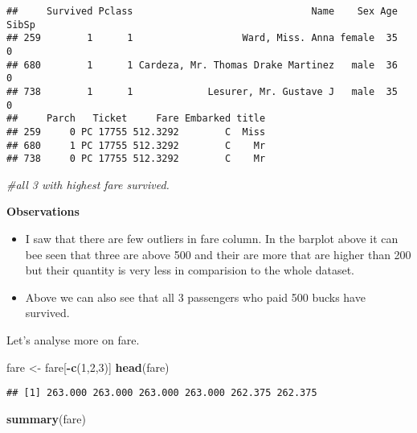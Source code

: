 \documentclass[]{article}
\newenvironment{Shaded}{\begin{snugshade}}{\end{snugshade}}
\newcommand{\KeywordTok}[1]{\textcolor[rgb]{0.13,0.29,0.53}{\textbf{#1}}}
\newcommand{\DecValTok}[1]{\textcolor[rgb]{0.00,0.00,0.81}{#1}}
\newcommand{\StringTok}[1]{\textcolor[rgb]{0.31,0.60,0.02}{#1}}
\newcommand{\CommentTok}[1]{\textcolor[rgb]{0.56,0.35,0.01}{\textit{#1}}}
\newcommand{\OperatorTok}[1]{\textcolor[rgb]{0.81,0.36,0.00}{\textbf{#1}}}
\newcommand{\NormalTok}[1]{#1}
\begin{document}
\begin{verbatim}
##     Survived Pclass                               Name    Sex Age SibSp
## 259        1      1                   Ward, Miss. Anna female  35     0
## 680        1      1 Cardeza, Mr. Thomas Drake Martinez   male  36     0
## 738        1      1             Lesurer, Mr. Gustave J   male  35     0
##     Parch   Ticket     Fare Embarked title
## 259     0 PC 17755 512.3292        C  Miss
## 680     1 PC 17755 512.3292        C    Mr
## 738     0 PC 17755 512.3292        C    Mr
\end{verbatim}

\begin{Shaded}
\begin{Highlighting}[]
\CommentTok{#all 3 with highest fare survived.}
\end{Highlighting}
\end{Shaded}

\textbf{Observations}

\begin{itemize}
\item
  I saw that there are few outliers in fare column. In the barplot above
  it can bee seen that three are above 500 and their are more that are
  higher than 200 but their quantity is very less in comparision to the
  whole dataset.
\item
  Above we can also see that all 3 passengers who paid 500 bucks have
  survived.
\end{itemize}

Let's analyse more on fare.

\begin{Shaded}
\begin{Highlighting}[]
\NormalTok{fare <-}\StringTok{ }\NormalTok{fare[}\OperatorTok{-}\KeywordTok{c}\NormalTok{(}\DecValTok{1}\NormalTok{,}\DecValTok{2}\NormalTok{,}\DecValTok{3}\NormalTok{)]}
\KeywordTok{head}\NormalTok{(fare)}
\end{Highlighting}
\end{Shaded}

\begin{verbatim}
## [1] 263.000 263.000 263.000 263.000 262.375 262.375
\end{verbatim}

\begin{Shaded}
\begin{Highlighting}[]
\KeywordTok{summary}\NormalTok{(fare)}
\end{Highlighting}
\end{Shaded}
\end{document}

